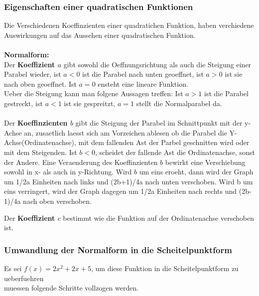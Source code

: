 \documentclass[a4paper]{article} %
\begin{document}
	\subsubsection{Eigenschaften einer quadratischen Funktionen}
	Die Verschiedenen Koeffinzienten einer quadratichen Funktion, haben verchiedene Auswirkungen auf das Aussehen einer
	quadratischen Funktion.\\
	\\ \textbf{Normalform:}\\
	Der \textbf{Koeffizient $a$} gibt sowohl die Oeffnungsrichtung als auch die Steigung einer Parabel wieder, ist $a < 0$ ist die Parabel nach unten geoeffnet, ist $a > 0$ ist sie nach oben geoeffnet. Ist $a = 0$ ensteht eine lineare Funktion.\texttt{}\\
	Ueber die Steigung kann man folgene Aussagen treffen: Ist $a > 1$ ist die Parabel gestreckt, ist $a<1$ ist sie gespreitzt, $a=1$ stellt die Normalparabel da.
	\\\\Der \textbf{Koeffinzienten $b$} gibt die Steigung der Parabel im Schnittpunkt mit der y-Achse an, zusaetlich laesst sich am Vorzeichen ablesen
	ob die Parabel die Y-Achse(Ordinatenachse), mit dem fallenden Ast der Parbel geschnitten wird oder mit dem Steigenden.
	Ist $b < 0$, scheidet der fallende Ast die Ordinatenachse, sonst der Andere.
	Eine Veraenderung des Koeffinzienten $b$ bewirkt eine Verschiebung sowohl in x- als auch in y-Richtung. Wird $b$ um eins eroeht, dann wird der Graph um 1/2a Einheiten nach links und (2b+1)/4a nach unten verschoben. Wird b um eins verringert, wird der Graph dagegen um 1/2a Einheiten nach rechts und (2b-1)/4a nach oben verschoben.
	
	

	\hspace{-1.5 cm}
	Der \textbf{Koeffizient $c$} bestimmt wie die Funktion auf der Ordinatenachse verschoben ist.


	\subsubsection{Umwandlung der Normalform in die Scheitelpunktform}
	
		Es sei $f(x)=2x^2+2x+5$, um diese Funktion in die Scheitelpunktform zu ueberfuehren\\ muessen folgende Schritte vollzogen werden.
		
\end{document}
